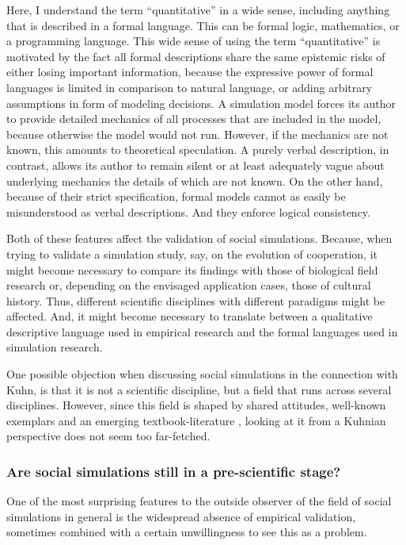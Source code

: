 \documentclass[12pt, a4paper]{article}
\begin{document}
Here, I understand the term ``quantitative'' in a wide sense,
including anything that is described in a formal language. This can be
formal logic, mathematics, or a programming language. This wide sense
of using the term ``quantitative'' is motivated by the fact all formal
descriptions share the same epistemic risks of either losing important
information, because the expressive power of formal languages is
limited in comparison to natural language, or adding arbitrary
assumptions in form of modeling decisions. A simulation model forces
its author to provide detailed mechanics of all processes that are
included in the model, because otherwise the model would not run.
However, if the mechanics are not known, this amounts to theoretical
speculation. A purely verbal description, in contrast, allows its
author to remain silent or at least adequately vague about underlying
mechanics the details of which are not known. On the other hand,
because of their strict specification, formal models cannot as easily
be misunderstood as verbal descriptions. And they enforce logical
consistency.

Both of these features affect the validation of social simulations.
Because, when trying to validate a simulation study, say, on the
evolution of cooperation, it might become necessary to compare its
findings with those of biological field research or, depending on the
envisaged application cases, those of cultural history. Thus,
different scientific disciplines with different paradigms might be
affected. And, it might become necessary to translate between a
qualitative descriptive language used in empirical research and the
formal languages used in simulation research.

One possible objection when discussing social simulations in the
connection with Kuhn, is that it is not a scientific discipline, but a
field that runs across several disciplines. However, since this field
is shaped by shared attitudes, well-known exemplars
\citep{axelrod:1984, axtell-et-al:2002, epstein-axtell:1996,
schelling:1971} and an emerging textbook-literature
\citep{railsback-grimm:2012, gilbert-troitzsch:2005}, looking at it
from a Kuhnian perspective does not seem too far-fetched.

\subsubsection{Are social simulations still in a pre-scientific stage?}

One of the most surprising features to the outside observer of the field of
social simulations in general is the widespread absence of empirical
validation, sometimes combined with a certain unwillingness to see this as a
problem.
\end{document}
